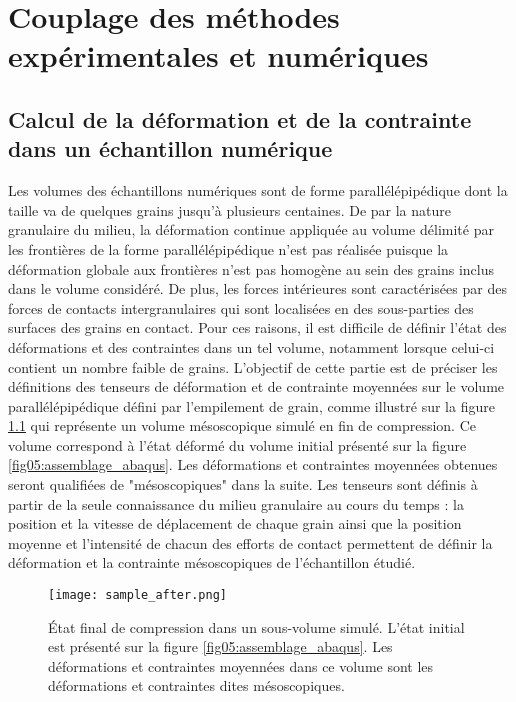 \graphicspath{{./06-Comparaison/images/}}	

\chapter[Couplage expérimental/numérique]{Couplage des méthodes expérimentales et numériques}\label{chap:couplage}

\section[Déformations et contraintes mésoscopiques]{Calcul de la déformation et de la contrainte dans un échantillon numérique}
Les volumes des échantillons numériques sont de forme parallélépipédique dont la taille va de quelques grains jusqu'à plusieurs centaines. De par la nature granulaire du milieu, la déformation continue appliquée au volume délimité par les frontières de la forme parallélépipédique n'est pas réalisée puisque la déformation globale aux frontières n'est pas homogène au sein des grains inclus dans le volume considéré. De plus, les forces intérieures sont caractérisées par des forces de contacts intergranulaires qui sont localisées en des sous-parties des surfaces des grains en contact. Pour ces raisons, il est difficile de définir l'état des déformations et des contraintes dans un tel volume, notamment lorsque celui-ci contient un nombre faible de grains. L'objectif de cette partie est de préciser les définitions des tenseurs de déformation et de contrainte moyennées sur le volume parallélépipédique défini par l'empilement de grain, comme illustré sur la figure \ref{fig06:volume_simu_apres} qui représente un volume mésoscopique simulé en fin de compression. Ce volume correspond à l'état déformé du volume initial présenté sur la figure \ref{fig05:assemblage_abaqus}. Les déformations et contraintes moyennées obtenues seront qualifiées de "mésoscopiques" dans la suite. Les tenseurs sont définis à partir de la seule connaissance du milieu granulaire au cours du temps : la position et la vitesse de déplacement de chaque grain ainsi que la position moyenne et l'intensité de chacun des efforts de contact permettent de définir la déformation et la contrainte mésoscopiques de l'échantillon étudié.
\begin{figure}\centering
	\texttt{[image: sample\_after.png]}
	\caption{\label{fig06:volume_simu_apres}\'Etat final de compression dans un sous-volume simulé. L'état initial est présenté sur la figure \ref{fig05:assemblage_abaqus}. Les déformations et contraintes moyennées dans ce volume sont les déformations et contraintes dites mésoscopiques.}
\end{figure}
